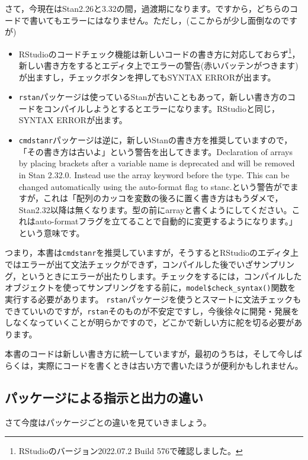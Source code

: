 \documentclass{ltjsbook}
\begin{document}
さて，今現在はStan2.26と3.32の間，過渡期になります。ですから，どちらのコードで書いてもエラーにはなりません。ただし，(ここからが少し面倒なのですが)
\begin{itemize}
	\item RStudioのコードチェック機能は新しいコードの書き方に対応しておらず\footnote{RStudioのバージョン2022.07.2 Build 576で確認しました。}，新しい書き方をするとエディタ上でエラーの警告(赤いバッテンがつきます)が出ますし，チェックボタンを押してもSYNTAX ERRORが出ます。
	\item \verb|rstan|パッケージは使っているStanが古いこともあって，新しい書き方のコードをコンパイルしようとするとエラーになります。RStudioと同じ，SYNTAX ERRORが出ます。
	\item \verb|cmdstanr|パッケージは逆に，新しいStanの書き方を推奨していますので，「その書き方は古いよ」という警告を出してきます。Declaration of arrays by placing brackets after a variable name is deprecated and will be removed in Stan 2.32.0. Instead use the array keyword before the type. This can be changed automatically using the auto-format flag to stanc.という警告がでますが，これは「配列のカッコを変数の後ろに置く書き方はもうダメで，Stan2.32以降は無くなります。型の前にarrayと書くようにしてください。これはauto-formatフラグを立てることで自動的に変更するようになります。」という意味です。
\end{itemize}

つまり，本書は\verb|cmdstanr|を推奨していますが，そうするとRStudioのエディタ上ではエラーが出て文法チェックができず，コンパイルした後でいざサンプリング，というときにエラーが出たりします。チェックをするには，コンパイルしたオブジェクトを使ってサンプリングをする前に，\verb|model$check_syntax()|関数を実行する必要があります。
\verb|rstan|パッケージを使うとスマートに文法チェックもできていいのですが，\verb|rstan|そのものが不安定ですし，今後徐々に開発・発展をしなくなっていくことが明らかですので，どこかで新しい方に舵を切る必要があります。

本書のコードは新しい書き方に統一していますが，最初のうちは，そして今しばらくは，実際にコードを書くときは古い方で書いたほうが便利かもしれません。
\subsection{パッケージによる指示と出力の違い}
さて今度はパッケージごとの違いを見ていきましょう。
\end{document}
